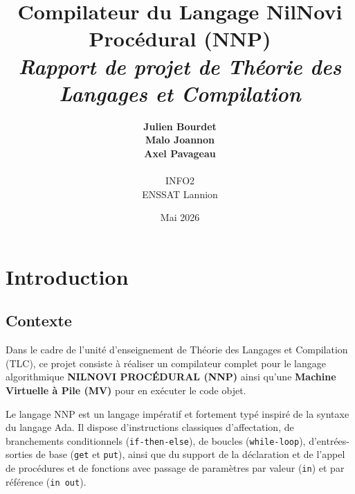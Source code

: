 \documentclass[a4paper, 12pt]{article}
\title{
    \vspace{2cm}
    \Huge\color{navyblue}\textbf{Compilateur du Langage NilNovi Procédural (NNP)}\\
    \vspace{0.5cm}
    \large\color{charcoal}\textit{Rapport de projet de Théorie des Langages et Compilation}\\
    \vspace{1.5cm}
}
\author{
    \textbf{Julien Bourdet}\\
    \textbf{Malo Joannon}\\
    \textbf{Axel Pavageau} \\
    \vspace{1cm}\\
    \color{charcoal}INFO2\\
    \color{charcoal}ENSSAT Lannion\\
}
\date{Mai 2026}
\begin{document}
\maketitle
\begin{center}
    \vspace{1cm}
    \vspace{2cm}
\end{center}
\thispagestyle{empty}
\newpage

\tableofcontents
\newpage

\section{Introduction}

\subsection{Contexte}
Dans le cadre de l'unité d'enseignement de Théorie des Langages et Compilation (TLC), ce projet consiste à réaliser un compilateur complet pour le langage algorithmique \textbf{NILNOVI PROCÉDURAL (NNP)} ainsi qu'une \textbf{Machine Virtuelle à Pile (MV)} pour en exécuter le code objet. 

Le langage NNP est un langage impératif et fortement typé inspiré de la syntaxe du langage Ada. Il dispose d'instructions classiques d'affectation, de branchements conditionnels (\texttt{if-then-else}), de boucles (\texttt{while-loop}), d'entrées-sorties de base (\texttt{get} et \texttt{put}), ainsi que du support de la déclaration et de l'appel de procédures et de fonctions avec passage de paramètres par valeur (\texttt{in}) et par référence (\texttt{in out}).
\end{document}
